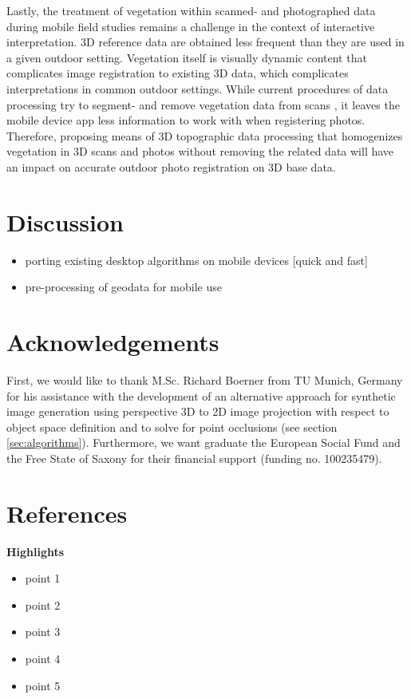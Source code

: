 \documentclass[review]{elsarticle}
\begin{document}
Lastly, the treatment of vegetation within scanned- and photographed data during mobile field studies remains a challenge in the context of interactive interpretation. 3D reference data are obtained less frequent than they are used in a given outdoor setting. Vegetation itself is visually dynamic content that complicates image registration to existing 3D data, which complicates interpretations in common outdoor settings. While current procedures of data processing try to segment- and remove vegetation data from scans \cite{}, it leaves the mobile device app less information to work with when registering photos. Therefore, proposing means of 3D topographic data processing that homogenizes vegetation in 3D scans and photos without removing the related data will have an impact on accurate outdoor photo registration on 3D base data.


\section{Discussion}
\label{sec:discussion}

\begin{itemize}
\item porting existing desktop algorithms on mobile devices [quick and fast]
\item pre-processing of geodata for mobile use
\end{itemize}

\section*{Acknowledgements}
First, we would like to thank M.Sc. Richard Boerner from TU Munich, Germany for his assistance with the development of an alternative approach for synthetic image generation using perspective 3D to 2D image projection with respect to object space definition and to solve for point occlusions (see section \ref{sec:algorithms}). Furthermore, we want graduate the European Social Fund and the Free State of Saxony for their financial support (funding no. 100235479).

\section*{References}



\textbf{Highlights} \\
\begin{itemize}
\item point 1
\item point 2
\item point 3
\item point 4
\item point 5
\end{itemize}
\end{document}
